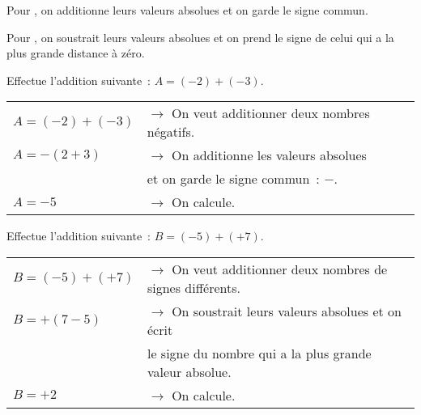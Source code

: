 

\begin{methode*1}

\begin{aconnaitre}
Pour , on additionne leurs valeurs absolues et on garde le signe commun.

Pour , on soustrait leurs valeurs absolues et on prend le signe de celui qui a la plus grande distance à zéro.
\end{aconnaitre}

\begin{exemple*1}
Effectue l'addition suivante : $A = (-2) + (-3)$.
\begin{tabular}{ll} 
$A = (-2) + (-3)$ & $\rightarrow$ On veut additionner deux nombres négatifs. \\
$A = -(2 + 3)$ & $\rightarrow$ On additionne les valeurs absolues \\
 & \phantom{$\rightarrow$} et on garde le signe commun : $-$. \\
$A = -5$ & $\rightarrow$ On calcule.
\end{tabular}
 \end{exemple*1}
 
 \begin{exemple*1}
Effectue l'addition suivante : $B = (-5) + (+7)$.
\begin{tabular}{ll} 
$B = (-5) + (+7)$ & $\rightarrow$ On veut additionner deux nombres de signes différents. \\
$B = +(7 - 5)$ & $\rightarrow$ On soustrait leurs valeurs absolues et on écrit \\
 & \phantom{$\rightarrow$} le signe du nombre qui a la plus grande valeur absolue. \\
$B = +2$ & $\rightarrow$ On calcule.
\end{tabular}
 \end{exemple*1}
 

\end{methode*1}
